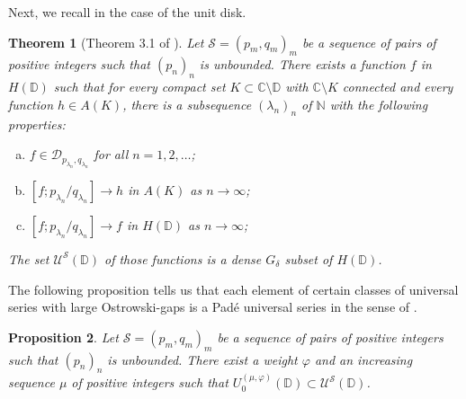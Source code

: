 \documentclass[12pt]{amsart}
\numberwithin{equation}{section}
\newtheorem{theorem}{Theorem}[section]
\newtheorem{proposition}[theorem]{Proposition}
\begin{document}
Next, we recall \cite[Theorem 3.1]{DFN} in the case of the unit disk.

\begin{theorem}[Theorem 3.1 of \cite{DFN}]\label{thm-DFN}Let $\mathcal{S}=\left(p_m,q_m\right)_m$ be a sequence of pairs of positive integers such that $\left(p_n\right)_n$ is unbounded. There exists a function $f$ in $H({\mathbb D})$ such that for every compact set $K\subset {\mathbb{C}}\setminus {\mathbb D}$ with ${\mathbb{C}}\setminus K$ connected and every function $h\in A(K)$, there is a subsequence $\left(\lambda_n\right)_n$ of ${\mathbb{N}}$ with the following properties:
\begin{enumerate}[a)]
\item $f\in {\mathcal D} _{p_{\lambda _n},q_{\lambda _n}}$ for all $n=1,2,\ldots$;
\item $[f;p_{\lambda _n}/q_{\lambda _n}]\rightarrow h$ in $A(K)$ as $n\rightarrow \infty$;
\item $[f;p_{\lambda _n}/q_{\lambda _n}]\rightarrow f$ in $H({\mathbb D})$ as $n\rightarrow \infty$;
\end{enumerate}
The set ${\mathcal U} ^{\mathcal{S}}({\mathbb D})$ of those functions is a dense $G_{\delta}$ subset of $H({\mathbb D})$.
\end{theorem}

The following proposition tells us that each element of certain classes of universal series with large Ostrowski-gaps is a Pad\'e universal series in the sense of \cite[Theorem 3.1]{DFN}.

\begin{proposition}\label{last-prop-end}Let $\mathcal{S}=\left(p_m,q_m\right)_m$ be a sequence of pairs of positive integers such that $\left(p_n\right)_n$ is unbounded. There exist a weight $\varphi$ and an increasing sequence $\mu$ of positive integers such that $U_0^{(\mu,\varphi)}({\mathbb D})\subset {\mathcal U} ^{\mathcal{S}}({\mathbb D})$.
\end{proposition}
\end{document}
